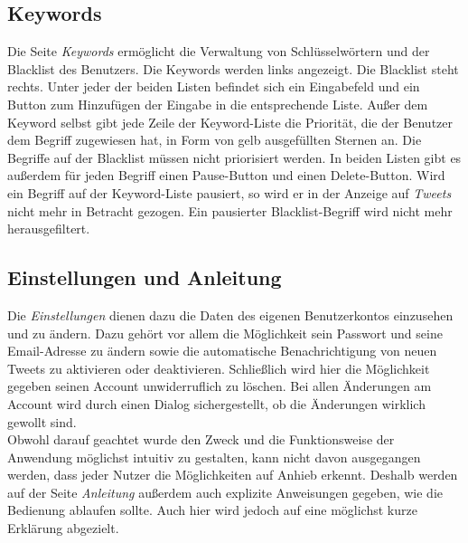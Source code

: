 \subsection{Keywords}
Die Seite \textit{Keywords} ermöglicht die Verwaltung von Schlüsselwörtern und der Blacklist des Benutzers. Die Keywords werden links angezeigt. Die Blacklist steht rechts. Unter jeder der beiden Listen befindet sich ein Eingabefeld und ein Button zum Hinzufügen der Eingabe in die entsprechende Liste. Außer dem Keyword selbst gibt jede Zeile der Keyword-Liste die Priorität, die der Benutzer dem Begriff zugewiesen hat, in Form von gelb ausgefüllten Sternen an. Die Begriffe auf der Blacklist müssen nicht priorisiert werden. In beiden Listen gibt es außerdem für jeden Begriff einen \glqq Pause\grqq{}-Button und einen \glqq Delete\grqq{}-Button. Wird ein Begriff auf der Keyword-Liste pausiert, so wird er in der Anzeige auf \textit{Tweets} nicht mehr in Betracht gezogen. Ein pausierter Blacklist-Begriff wird nicht mehr herausgefiltert.
%
\subsection{Einstellungen und Anleitung}
Die \textit{Einstellungen} dienen dazu die Daten des eigenen Benutzerkontos einzusehen und zu ändern. Dazu gehört vor allem die Möglichkeit sein Passwort und seine Email-Adresse zu ändern sowie die automatische Benachrichtigung von neuen Tweets zu aktivieren oder deaktivieren. Schließlich wird hier die Möglichkeit gegeben seinen Account unwiderruflich zu löschen. Bei allen Änderungen am Account wird durch einen Dialog sichergestellt, ob die Änderungen wirklich gewollt sind. \\
Obwohl darauf geachtet wurde den Zweck und die Funktionsweise der Anwendung möglichst intuitiv zu gestalten, kann nicht davon ausgegangen werden, dass jeder Nutzer die Möglichkeiten auf Anhieb erkennt. Deshalb werden auf der Seite \textit{Anleitung} außerdem auch explizite Anweisungen gegeben, wie die Bedienung ablaufen sollte. Auch hier wird jedoch auf eine möglichst kurze Erklärung abgezielt.






